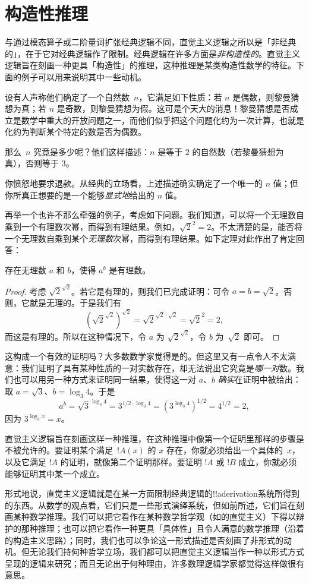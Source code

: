 \documentclass[../../../include/open-logic-chapter]{subfiles}
\begin{document}

\section{构造性推理}

与通过模态算子或二阶量词扩张经典逻辑不同，直觉主义逻辑之所以是「非经典的」，在于它对经典逻辑作了限制。经典逻辑在许多方面是\emph{非构造性的}。直觉主义逻辑旨在刻画一种更具「构造性」的推理，这种推理是某类构造性数学的特征。下面的例子可以用来说明其中一些动机。

设有人声称他们确定了一个自然数~$n$，它满足如下性质：若 $n$ 是偶数，则黎曼猜想为真；若 $n$ 是奇数，则黎曼猜想为假。这可是个天大的消息！{}黎曼猜想是否成立是数学中重大的开放问题之一，而他们似乎把这个问题化约为一次计算，也就是化约为判断某个特定的数是否为偶数。

那么~$n$ 究竟是多少呢？他们这样描述：$n$ 是等于 $2$ 的自然数（若黎曼猜想为真），否则等于 $3$。

你愤怒地要求退款。从经典的立场看，上述描述确实确定了一个唯一的 $n$ 值；但你所真正想要的是一个能够\emph{显式地}给出的 $n$ 值。

再举一个也许不那么牵强的例子，考虑如下问题。我们知道，可以将一个无理数自乘到一个有理数次幂，而得到有理结果。例如，$\sqrt{2}^2 = 2$。不太清楚的是，能否将一个无理数自乘到某个\emph{无理数}次幂，而得到有理结果。如下定理对此作出了肯定回答：

\begin{thm}
存在无理数 $a$ 和 $b$，使得 $a^b$ 是有理数。
\end{thm}

\begin{proof}
考虑 $\sqrt{2}^{\sqrt{2}}$。若它是有理的，则我们已完成证明：可令 $a = b = \sqrt{2}$。否则，它就是无理的。于是我们有
\[
(\sqrt{2}^{\sqrt{2}})^{\sqrt{2}} = \sqrt{2}^{\sqrt{2} \cdot
  \sqrt{2}} = \sqrt{2}^2 = 2,
\]
而这是有理的。所以在这种情况下，令 $a$ 为
$\sqrt{2}^{\sqrt{2}}$，令 $b$ 为~$\sqrt 2$ 即可。
\end{proof}

这构成一个有效的证明吗？大多数数学家觉得是的。但这里又有一点令人不太满意：我们证明了具有某种性质的一对实数存在，却无法说出它究竟是\emph{哪一对}数。我们也可以用另一种方式来证明同一结果，使得这一对 $a$、$b$ \emph{确实}在证明中被给出：取 $a = \sqrt{3}$、$b = \log_3 4$。于是
\[
a^b = \sqrt{3}^{\log_3 4} = 3^{1/2 \cdot \log_3 4} = (3^{\log_3
  4})^{1/2} = 4^{1/2}= 2,
\]
因为 $3^{\log_3 x} = x$。

直觉主义逻辑旨在刻画这样一种推理，在这种推理中像第一个证明里那样的步骤是不被允许的。要证明某个满足~$!A(x)$ 的 $x$ 存在，你就必须给出一个具体的~$x$，以及它满足 $!A$ 的证明，就像第二个证明那样。要证明 $!A$ 或 $!B$ 成立，你就必须能够证明其中某一个成立。

形式地说，直觉主义逻辑就是在某一方面限制经典逻辑的!!a{derivation}系统所得到的东西。从数学的观点看，它们只是一些形式演绎系统，但如前所述，它们旨在刻画某种数学推理。我们可以把它看作在某种数学哲学观（如的直觉主义）下得以辩护的那种推理；也可以把它看作一种更具「具体性」且令人满意的数学推理（沿着的构造主义思路）；同时，我们也可以争论这一形式描述是否刻画了非形式的动机。但无论我们持何种哲学立场，我们都可以把直觉主义逻辑当作一种以形式方式呈现的逻辑来研究；而且无论出于何种理由，许多数理逻辑学家都觉得这样做很有意思。
\end{document}

